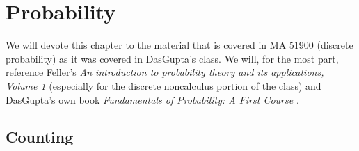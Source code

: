 \chapter{Probability}
We will devote this chapter to the material that is covered in MA 51900
(discrete probability) as it was covered in DasGupta's class. We will, for
the most part, reference Feller's \emph{An introduction to probability
  theory and its applications, Volume 1} \cite{feller} (especially for the
discrete noncalculus portion of the class) and DasGupta's own book
\emph{Fundamentals of Probability: A First Course} \cite{dasgupta}.

\section{Counting}

